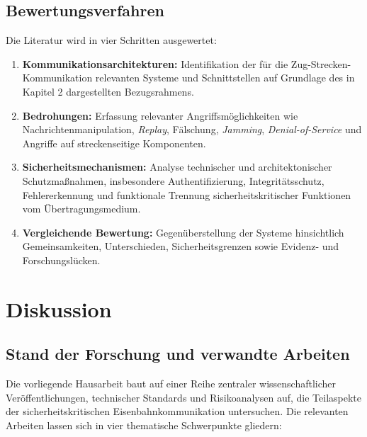\documentclass[runningheads]{res/llncs}
\begin{document}
\subsection{Bewertungsverfahren}
\label{sec:Bewertungsverfahren}

Die Literatur wird in vier Schritten ausgewertet:

\begin{enumerate}
    \item \textbf{Kommunikationsarchitekturen:} Identifikation der für die Zug-Strecken-Kommunikation relevanten Systeme und Schnittstellen auf Grundlage des in Kapitel 2 dargestellten Bezugsrahmens.

    \item \textbf{Bedrohungen:} Erfassung relevanter Angriffsmöglichkeiten wie Nachrichtenmanipulation, \textit{Replay}, Fälschung, \textit{Jamming}, \textit{Denial-of-Service} und Angriffe auf streckenseitige Komponenten.

    \item \textbf{Sicherheitsmechanismen:} Analyse technischer und architektonischer Schutzmaßnahmen, insbesondere Authentifizierung, Integritätsschutz, Fehlererkennung und funktionale Trennung sicherheitskritischer Funktionen vom Übertragungsmedium.

    \item \textbf{Vergleichende Bewertung:} Gegenüberstellung der Systeme hinsichtlich Gemeinsamkeiten, Unterschieden, Sicherheitsgrenzen sowie Evidenz- und Forschungslücken.
\end{enumerate}

\section{Diskussion}
\label{sec:Diskussion}

\subsection{Stand der Forschung und verwandte Arbeiten} \label{sec:Stand_der_Forschung_und_verwandte_Arbeiten}
Die vorliegende Hausarbeit baut auf einer Reihe zentraler wissenschaftlicher Veröffentlichungen, technischer Standards und Risikoanalysen auf, die Teilaspekte der sicherheitskritischen Eisenbahnkommunikation untersuchen. Die relevanten Arbeiten lassen sich in vier thematische Schwerpunkte gliedern:
\end{document}
